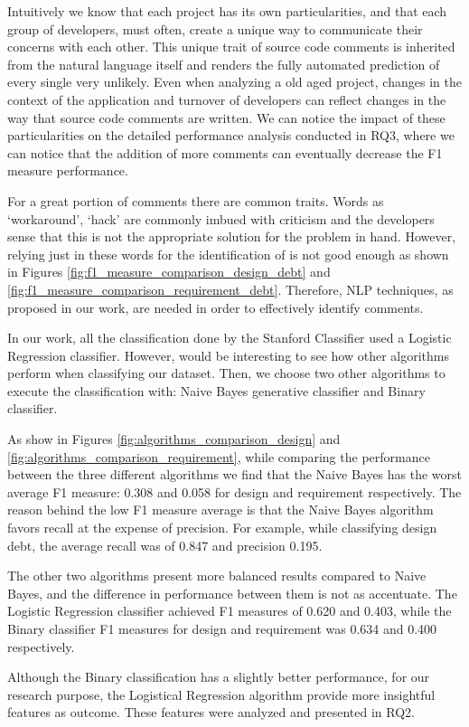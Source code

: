 Intuitively we know that each project has its own particularities, and that each group of developers, must often, create a unique way to communicate their concerns with each other. This unique trait of source code comments is inherited from the natural language itself and renders the fully automated prediction of every single \SATD very unlikely. Even when analyzing a old aged project, changes in the context of the application and turnover of developers can reflect changes in the way that source code comments are written. We can notice the impact of these particularities on the detailed performance analysis conducted in RQ3, where we can notice that the addition of more comments can eventually decrease the F1 measure performance.

For a great portion of \SATD comments there are common traits. Words as `workaround', `hack' are commonly imbued with criticism and the developers sense that this is not the appropriate solution for the problem in hand. However, relying just in these words for the identification of \SATD is not good enough as shown in Figures \ref{fig:f1_measure_comparison_design_debt} and \ref{fig:f1_measure_comparison_requirement_debt}. Therefore, NLP techniques, as proposed in our work, are needed in order to effectively identify \SATD comments.

In our work, all the classification done by the Stanford Classifier used a Logistic Regression classifier. However, would be interesting to see how other  algorithms perform when classifying our dataset. Then, we choose two other algorithms to execute the classification with: Naive Bayes generative classifier and Binary classifier.

As show in Figures \ref{fig:algorithms_comparison_design} and \ref{fig:algorithms_comparison_requirement}, while comparing the performance between the three different algorithms we find that the Naive Bayes has the worst average F1 measure: 0.308 and 0.058 for design and requirement \SATD respectively. The reason behind the low F1 measure average is that the Naive Bayes algorithm favors recall at the expense of precision. For example, while classifying design debt, the average recall was of 0.847 and precision 0.195.

The other two algorithms present more balanced results compared to Naive Bayes, and the difference in performance between them is not as accentuate. The Logistic Regression classifier achieved F1 measures of 0.620 and 0.403, while the Binary classifier F1 measures for design and requirement \SATD was 0.634 and 0.400 respectively. 

Although the Binary classification has a slightly better performance, for our research purpose, the Logistical Regression algorithm provide more insightful features as outcome. These features were analyzed and presented in RQ2. 